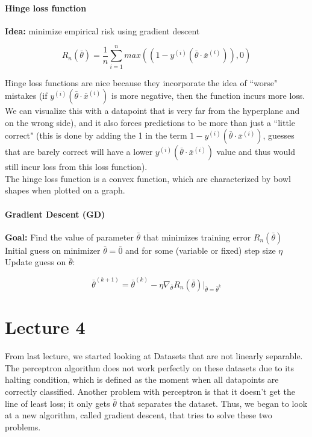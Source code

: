 \documentclass[12pt]{article}
\begin{document}
\subsection{Hinge loss function}

\textbf{Idea:} minimize empirical risk using gradient descent

\[ R_n(\bar{\theta}) = \frac 1 n \sum_{i=1}^n max((1 - y^{(i)}(\bar{\theta} \cdot \bar{x}^{(i)})), 0) \]

Hinge loss functions are nice because they incorporate the idea of ``worse" mistakes (if $y^{(i)}(\bar{\theta} \cdot \bar{x}^{(i)})$ is more negative, then the function incurs more loss. We can visualize this with a datapoint that is very far from the hyperplane and on the wrong side), and it also forces predictions to be more than just a ``little correct" (this is done by adding the 1 in the term $1 - y^{(i)}(\bar{\theta} \cdot \bar{x}^{(i)})$, guesses that are barely correct will have a lower $y^{(i)}(\bar{\theta} \cdot \bar{x}^{(i)})$ value and thus would still incur loss from this loss function).\\

The hinge loss function is a convex function, which are characterized by bowl shapes when plotted on a graph. 

\subsection{Gradient Descent (GD)}

\textbf{Goal:} Find the value of parameter $\bar{\theta}$ that minimizes training error $R_n(\bar{\theta})$\\
Initial guess on minimizer $\bar{\theta} = \bar{0}$ and for some (variable or fixed) step size $\eta$\\

Update guess on $\bar{\theta}$:

\[ \bar{\theta}^{(k+1)} = \bar{\theta}^{(k)} - \eta \nabla_{\bar{\theta}}R_n(\bar{\theta}) |_{\bar{\theta} = \bar{\theta}^k}  \]


\part{Lecture 4}

From last lecture, we started looking at Datasets that are not linearly separable. The perceptron algorithm does not work perfectly on these datasets due to its halting condition, which is defined as the moment when all datapoints are correctly classified. Another problem with perceptron is that it doesn't get the line of least loss; it only gets $\bar{\theta}$ that separates the dataset. Thus, we began to look at a new algorithm, called gradient descent, that tries to solve these two problems.
\end{document}

